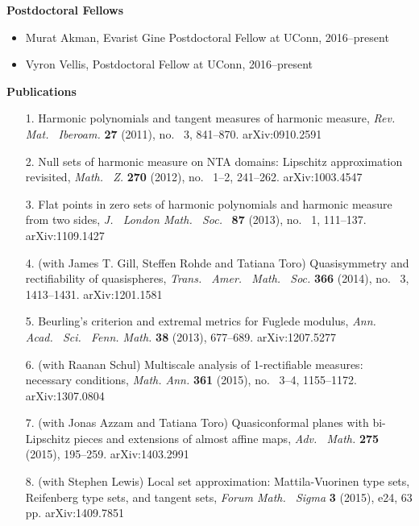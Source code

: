 \documentclass[12pt]{amsart}
\newcommand{\ssection}[1]{\noindent\textbf{#1}\vspace{.2cm}}
\newcommand{\esection}{\vspace{.3cm}}
\begin{document}
\esection

\ssection{Postdoctoral Fellows}

\begin{itemize}

\item Murat Akman, Evarist Gine Postdoctoral Fellow at UConn, 2016--present

\item Vyron Vellis, Postdoctoral Fellow at UConn, 2016--present

\end{itemize}

\esection


\ssection{Publications}

\begin{enumerate}
\item[1.] Harmonic polynomials and tangent measures of harmonic measure, \emph{Rev.~ Mat.~ Iberoam.} \textbf{27} (2011), no.~ 3, 841--870. \textsf{arXiv:0910.2591}
\item[2.] Null sets of harmonic measure on NTA domains: Lipschitz approximation revisited, \emph{Math.~ Z.} \textbf{270} (2012), no.~ 1--2, 241--262. \textsf{arXiv:1003.4547}
\item[3.] Flat points in zero sets of harmonic polynomials and harmonic measure from two sides, \emph{J.~ London Math.~ Soc.}~ \textbf{87} (2013), no.~ 1, 111--137. \textsf{arXiv:1109.1427}
\item[4.] (with James T. Gill, Steffen Rohde and Tatiana Toro) Quasisymmetry and rectifiability of quasispheres, \emph{Trans.~ Amer.~ Math.~ Soc.} \textbf{366} (2014), no.~ 3, 1413--1431. \textsf{arXiv:1201.1581}
\item[5.] Beurling's criterion and extremal metrics for Fuglede modulus, \emph{Ann.~ Acad.~ Sci.~ Fenn. Math.} \textbf{38} (2013), 677--689.
 \textsf{arXiv:1207.5277}
\item[6.] (with Raanan Schul) Multiscale analysis of 1-rectifiable measures: necessary conditions, \emph{Math. Ann.} \textbf{361} (2015), no.~ 3--4, 1155--1172. \textsf{arXiv:1307.0804}
\item[7.] (with Jonas Azzam and Tatiana Toro) Quasiconformal planes with bi-Lipschitz pieces and extensions of almost affine maps, \emph{Adv.~ Math.} \textbf{275} (2015), 195--259. \textsf{arXiv:1403.2991}
\item[8.] (with Stephen Lewis) Local set approximation: Mattila-Vuorinen type sets, Reifenberg type sets, and tangent sets, \emph{Forum Math.~ Sigma} \textbf{3} (2015), e24, 63 pp. \textsf{arXiv:1409.7851}

\end{enumerate}
\end{document}
